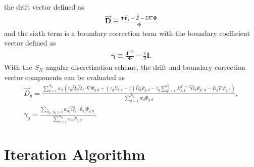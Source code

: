 the drift vector defined as
%
\begin{gather}
  \vec{\bm{D}} \equiv \frac{\bm{\tau}\vec{\bm{r}}_1-\vec{\bm{J}}-\mathbb{D}\nabla\bm{\Phi}}{\bm{\Phi}}
\end{gather}
%
and the sixth term is a boundary correction term with the boundary coefficient vector defined as
%
\begin{gather}
  \bm{\gamma} \equiv \frac{\bm{J}^\text{out}}{\bm{\Phi}}-\frac{1}{2}\bm{I}.
\end{gather}
%
With the $S_N$ angular discretization scheme, the drift and boundary correction vector components
can be evaluated as
%
\begin{gather}
  \vec{D}_g = \frac{\sum^{N_d}_{d=1}w_d\left(\tau_g\hat{\Omega}_d\hat{\Omega}_d\cdot\nabla\Psi_{g,d}
  + \left(\tau_g\Sigma_{t,g}-1\right)\hat{\Omega}_d\Psi_{g,d}
  - \tau_g\sum^G_{g'=1}\Sigma^{g'\rightarrow g}_{s,1}\hat{\Omega}_d\Psi_{g',d}
  - D_g\nabla\Psi_{g,d}\right)}{\sum^{N_d}_{d=1}w_d\Psi_{g,d}}, \label{eq:drift} \\
  \gamma_g =
  \frac{\sum_{\hat{\Omega}_d\cdot\hat{n}_b > 0}w_d |\hat{\Omega}_d\cdot\hat{n}_b |
  \Psi_{g,d}}{\sum^{N_d}_{d=1}w_d\Psi_{g,d}}. \label{eq:bound-coef}
\end{gather}

\section{Iteration Algorithm} \label{sec:hybrid-algorithm}

